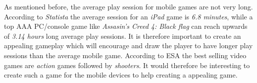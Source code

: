As mentioned before, the average play session for mobile games are not very long. According to \textit{Statista}\cite{statista} the average session for an \textit{iPad} game is \textit{6.8 minutes}\cite{statistaaverageappsession}, while a top AAA PC/console game like \textit{Assasin's Creed 4: Black flag} can reach upwards of \textit{3.14 hours}\cite{statistalongestsession} long average play sessions. 
It is therefore important to create an appealing gameplay which will encourage and draw the player to have longer play sessions than the average mobile game.
According to ESA the best selling video games are \textit{action} games followed by \textit{shooters}. It would therefore be interesting to create such a game for the mobile devices to help creating a appealing game.
